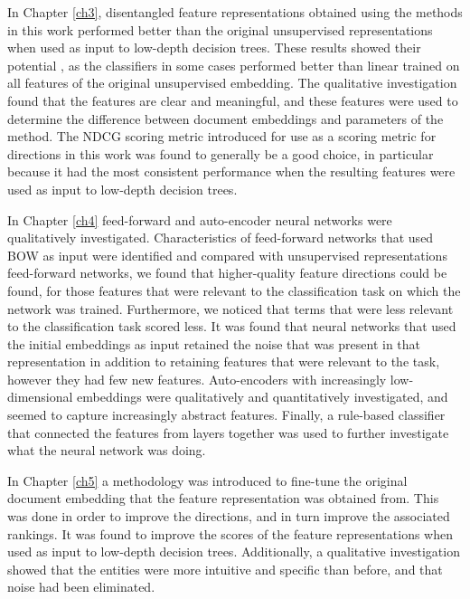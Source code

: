 In Chapter \ref{ch3}, disentangled feature representations obtained using the methods in this work performed better than the original unsupervised representations when used as input to low-depth decision trees. These results showed their potential ,  as the classifiers in some cases performed better than linear  trained on all features of the original unsupervised embedding.  The qualitative investigation found that the features are clear and meaningful, and these features were used to determine the difference between document embeddings and parameters of the method. The NDCG scoring metric introduced for use as a scoring metric for directions in this work was found to generally be a good choice, in particular because it had the most consistent performance when the resulting features were used as input to low-depth decision trees. 

In Chapter \ref{ch4} feed-forward and auto-encoder neural networks were qualitatively investigated. Characteristics of feed-forward networks that used BOW as input were identified and compared with unsupervised representations feed-forward networks, we found that higher-quality feature directions could be found, for those features that were relevant to the classification task on which the network was trained. Furthermore, we noticed that terms that were less relevant to the classification task scored less. It was found that neural networks that used the initial embeddings as input retained the noise that was present in that representation in addition to retaining features that were relevant to the task, however they had few new features. Auto-encoders with increasingly low-dimensional embeddings were qualitatively and quantitatively investigated, and  seemed to capture increasingly abstract features.  Finally,  a rule-based classifier that connected the features from layers together was used to further investigate what the neural network was doing. %

In Chapter \ref{ch5} a methodology was introduced to fine-tune the original document embedding that the feature representation was obtained from. This was done in order to improve the directions, and in turn improve the associated rankings. It was found to improve the scores of the feature representations when used as input to low-depth decision trees. Additionally, a qualitative investigation showed that the entities were more intuitive and specific than before, and that noise had been eliminated.



